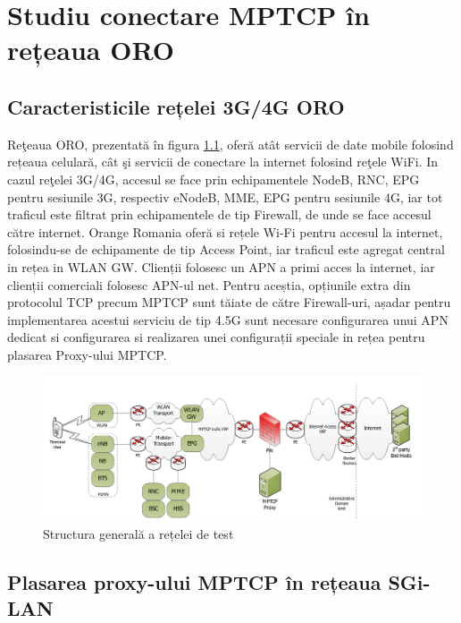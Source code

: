\chapter{Studiu conectare MPTCP în rețeaua ORO}
\label{sec:oro_arch}

\section{Caracteristicile rețelei 3G/4G ORO}

Reţeaua ORO, prezentată în figura \ref{fig:oro_network}, oferă atât
servicii de date mobile folosind rețeaua celulară, cât şi servicii de
conectare la internet folosind reţele WiFi.  In cazul reţelei 3G/4G,
accesul se face prin echipamentele NodeB, RNC, EPG pentru sesiunile
3G, respectiv eNodeB, MME, EPG pentru sesiunile 4G, iar tot traficul
este filtrat prin echipamentele de tip Firewall, de unde se face
accesul către internet.  Orange Romania oferă si rețele Wi-Fi pentru
accesul la internet, folosindu-se de echipamente de tip Access Point,
iar traficul este agregat central in rețea in WLAN GW.  Clienții
folosesc un APN a primi acces la internet, iar clienții comerciali
folosesc APN-ul net. Pentru aceștia, opțiunile extra din protocolul
TCP precum MPTCP sunt tăiate de către Firewall-uri, așadar pentru
implementarea acestui serviciu de tip 4.5G sunt necesare configurarea
unui APN dedicat si configurarea si realizarea unei configurații
speciale in rețea pentru plasarea Proxy-ului MPTCP.

\begin{figure}[h]
	\centering
	\includegraphics[scale=0.3]{figures/oro/oro_network.png}
	\caption{Structura generală a rețelei de test}
    	\label{fig:oro_network}
\end{figure}


\section{Plasarea proxy-ului MPTCP în rețeaua SGi-LAN}

